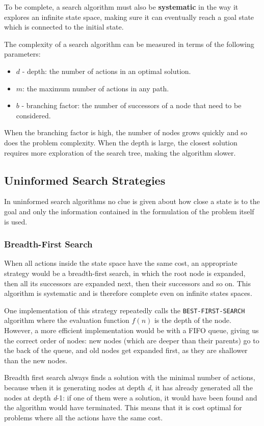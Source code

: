 \documentclass{article}
\newcommand{\code}{\lstinline}
\begin{document}
To be complete, a search algorithm must also be \textbf{systematic} in the way it explores an infinite state space, making sure it can eventually reach a goal state which is connected to the initial state. 

The complexity of a search algorithm can be measured in terms of the following parameters:
\begin{itemize}
    \item $d$ - depth: the number of actions in an optimal solution.
    \item $m$: the maximum number of actions in any path.
    \item $b$ - branching factor: the number of successors of a node that need to be considered. 
\end{itemize}

When the branching factor is high, the number of nodes grows quickly and so does the problem complexity. When the depth is large, the closest solution requires more exploration of the search tree, making the algorithm slower.

\subsection{Uninformed Search Strategies}
In uninformed search algorithms no clue is given about how close a state is to the goal and only the information contained in the formulation of the problem itself is used.

\subsubsection{Breadth-First Search}
When all actions inside the state space have the same cost, an appropriate strategy would be a breadth-first search, in which the root node is expanded, then all its successors are expanded next, then their successors and so on. This algorithm is systematic and is therefore complete even on infinite states spaces.

One implementation of this strategy repeatedly calls the \code{BEST-FIRST-SEARCH} algorithm where the evaluation function $f(n)$ is the depth of the node. However, a more efficient implementation would be with a FIFO queue, giving us the correct order of nodes: new nodes (which are deeper than their parents) go to the back of the queue, and old nodes get expanded first, as they are shallower than the new nodes.

Breadth first search always finds a solution with the minimal number of actions, because when it is generating nodes at depth \textit{d}, it has already generated all the nodes at depth \textit{d}-1: if one of them were a solution, it would have been found and the algorithm would have terminated. This means that it is cost optimal for problems where all the actions have the same cost.
\end{document}
